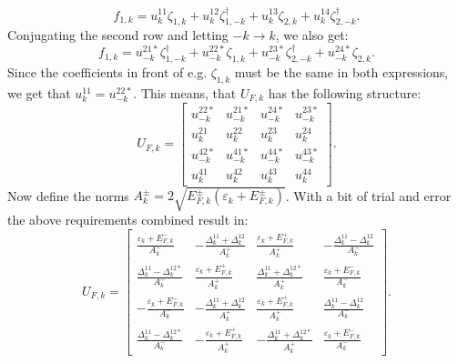 \begin{equation}
f_{1,k} = u^{11}_k \zeta_{1,k} + u^{12}_k \zeta^\dagger_{1,-k} + u^{13}_k \zeta_{2,k} + u^{14}_k \zeta^\dagger_{2,-k}. \nonumber
\end{equation}
Conjugating the second row and letting $-k \to k$, we also get:
\begin{equation}
f_{1,k} = u^{21*}_{-k} \zeta^\dagger_{1,-k} + u^{22*}_{-k} \zeta_{1,k} + u^{23*}_{-k} \zeta^\dagger_{2,-k} + u^{24*}_{-k} \zeta_{2,k}. \nonumber
\end{equation}
Since the coefficients in front of e.g. $\zeta_{1,k}$ must be the same in both expressions, we get that $u^{11}_k = u^{22*}_{-k}$. This means, that $U_{F,k}$ has the following structure:
\begin{equation}
U_{F,k} = \begin{bmatrix} 
u^{22*}_{-k} & u^{21*}_{-k} & u^{24*}_{-k} & u^{23*}_{-k}           \\  
u^{21}_k 	 & u^{22}_k 	& u^{23}_k 	   & u^{24}_k               \\ 
u^{42*}_{-k} & u^{41*}_{-k} & u^{44*}_{-k} & u^{43*}_{-k}           \\ 
u^{41}_k 	 & u^{42}_k 	& u^{43}_k 	   & u^{44}_k
\end{bmatrix}. \nonumber
\end{equation}
Now define the norms $A^{\pm}_k = 2 \sqrt{ E^{\pm}_{F,k}(\varepsilon_k + E^{\pm}_{F,k}) }$. With a bit of trial and error the above requirements combined result in:
\begin{equation}
U_{F,k} = \begin{bmatrix} 
\frac{\varepsilon_k + E^{-}_{F,k}}{A^{-}_k}    & -\frac{\Delta^{11}_k + \Delta^{12}_k}{A^{+}_k} & \frac{\varepsilon_k + E^{+}_{F,k}}{A^{+}_k}     & -\frac{\Delta^{11}_k - \Delta^{12}_k}{A^{-}_k}  \\  
\frac{\Delta^{11}_k - \Delta^{12*}_k}{A^{-}_k} & \frac{\varepsilon_k + E^{+}_{F,k}}{A^{+}_k}    & \frac{\Delta^{11}_k + \Delta^{12*}_k}{A^{+}_k}  & \frac{\varepsilon_k + E^{-}_{F,k}}{A^{-}_k}     \\ 
-\frac{\varepsilon_k + E^{-}_{F,k}}{A^{-}_k}   & -\frac{\Delta^{11}_k + \Delta^{12}_k}{A^{+}_k} & \frac{\varepsilon_k + E^{+}_{F,k}}{A^{+}_k}     & \frac{\Delta^{11}_k - \Delta^{12}_k}{A^{-}_k} \\ 
\frac{\Delta^{11}_k - \Delta^{12*}_k}{A^{-}_k} & -\frac{\varepsilon_k + E^{+}_{F,k}}{A^{+}_k}   & -\frac{\Delta^{11}_k + \Delta^{12*}_k}{A^{+}_k} & \frac{\varepsilon_k + E^{-}_{F,k}}{A^{-}_k} 
\end{bmatrix}. \nonumber
\end{equation}
